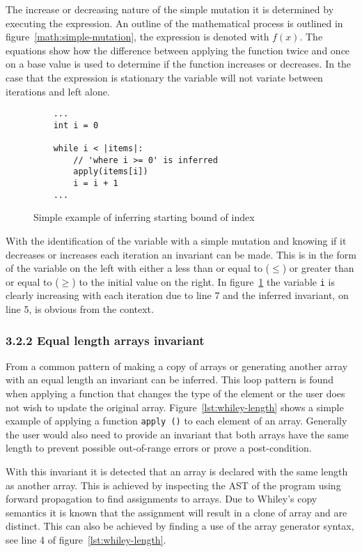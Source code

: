 \documentclass[11pt, a4paper, twoside, openright]{report}
\newcommand{\code}[1]{\texttt{#1}}
\begin{document}
The increase or decreasing nature of the simple mutation it is determined by
executing the expression. An outline of the mathematical process is outlined 
in figure~\ref{math:simple-mutation}, the expression is denoted with $f(x)$. 
The equations show how the difference between applying the function twice and once on a base value is used to
determine if the function increases or decreases.
In the case that the expression is stationary the variable will not variate
between iterations and left alone.

\begin{figure}[h]
\begin{lstlisting}
    ...
    int i = 0

    while i < |items|:
        // 'where i >= 0' is inferred
        apply(items[i])
        i = i + 1
    ...
\end{lstlisting}
\caption{Simple example of inferring starting bound of index}
\label{lst:whiley-start}
\end{figure}

With the identification of the variable with a simple mutation and knowing
if it decreases or increases each iteration an invariant can be made.
This is in the form of the variable on the left with either a less than or
equal to ($\leq$) or greater than or equal to ($\geq$) to the initial value on the
right.
In figure~\ref{lst:whiley-start} the variable \code{i} is clearly increasing
with each iteration due to line 7 and the inferred invariant, on line 5, is
obvious from the context.


\subsubsection*{3.2.2 Equal length arrays invariant}

From a common pattern of making a copy of arrays or generating another array
with an equal length an invariant can be inferred.
This loop pattern is found when applying a function that changes the type of
the element or the user does not wish to update the original array.
Figure~\ref{lst:whiley-length} shows a simple example of applying a function
\code{apply ()} to each element of an array.
Generally the user would also need to provide an invariant that both arrays
have the same length to prevent possible out-of-range errors or prove a
post-condition.

With this invariant it is detected that an array is declared with the same
length as another array.
This is achieved by inspecting the AST of the program
using forward propagation to find assignments to arrays.
Due to Whiley's copy semantics it is known that the assignment will result
in a clone of array and are distinct.
This can also be achieved by finding a use of the array
generator syntax, see line 4 of figure~\ref{lst:whiley-length}.
\end{document}

